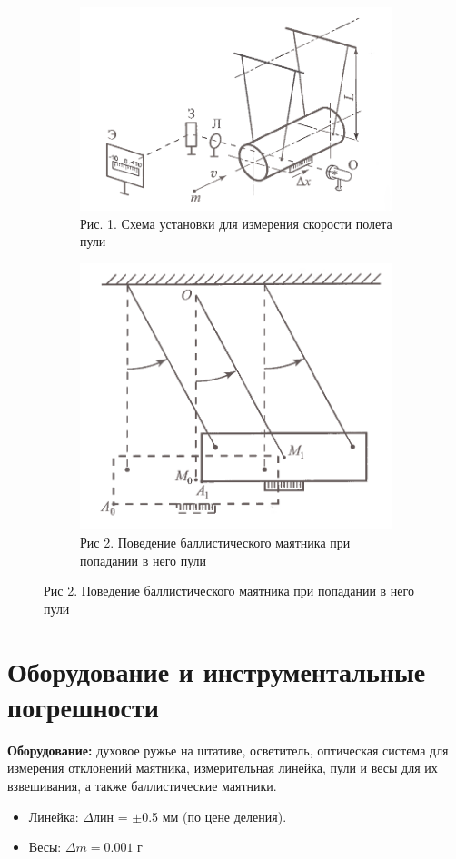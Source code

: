 \documentclass[a4paper, 12pt]{article}
\begin{document}
	
	\begin{figure}[h]
		
		\begin{subfigure}{0.5\textwidth}
			\includegraphics[width=0.9\linewidth]{1.png} 
			\caption{Рис. 1. Схема установки для измерения скорости полета пули}
			\label{fig:subim1}
		\end{subfigure}
		\begin{subfigure}{0.5\textwidth}
			\includegraphics[width=0.9\linewidth]{2.png}
			\caption{Рис 2. Поведение баллистического маятника при попадании в него пули}
			\label{fig:subim2}
		\end{subfigure}
		
	\end{figure}
	
	\section{Оборудование и инструментальные погрешности}
	\textbf{Оборудование:} духовое ружье на штативе, осветитель, оптическая система для измерения отклонений маятника, измерительная линейка, пули и весы для их взвешивания, а также баллистические маятники.
	\begin{itemize}
		\item Линейка: $\Delta{лин}$ = $\pm$0.5 мм (по цене деления).
		\item Весы: $\Delta m = 0.001\text{ г}$
	\end{itemize}
	
\end{document}
